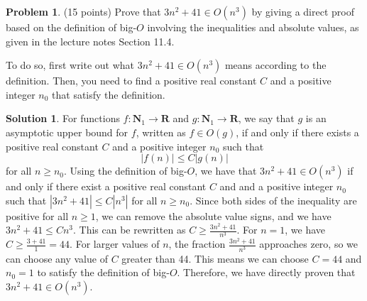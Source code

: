 \documentclass{article}
\theoremstyle{definition}
\newtheorem{problem}{Problem}
\newtheorem*{solution}{Solution}
\newcommand{\N}{\mathbf{N}}
\newcommand{\R}{\mathbf{R}}
\begin{document}
\newpage
\begin{problem} (15 points)
Prove that $3n^2+41 \in O(n^3)$ by giving a direct proof based on the definition of 
big-$O$ involving the inequalities and absolute values, as given in the lecture notes 
Section 11.4.  

To do so, first write out what $3n^2+41 \in O(n^3)$ means according to the definition.  
Then, you need to find a positive real constant $C$ and a positive integer $n_0$ 
that satisfy the definition.
\end{problem}
\begin{solution}
For functions $f: \N_1 \to \R$ and $g: \N_1 \to \R$, we say that $g$ is an asymptotic upper bound for $f$, 
written as $f \in O(g)$, if and only if there exists a positive real constant $C$ and a positive integer $n_0$
such that $$|f(n)| \leq C|g(n)|$$ for all $n \geq n_0$.
Using the definition of big-$O$, we have that $3n^2 + 41 \in O(n^3)$ if and only if 
there exist a positive real constant $C$ and and a positive integer $n_0$
such that $|3n^2 + 41| \leq C|n^3|$ for all $n \geq n_0$.
Since both sides of the inequality are positive for all $n \geq 1$, we can remove the absolute value signs,
and we have $3n^2 + 41 \leq Cn^3$. This can be rewritten as $C \geq \frac{3n^2 + 41}{n^3}$.
For $n = 1$, we have $C \geq \frac{3 + 41}{1} = 44$.
For larger values of $n$, the fraction $\frac{3n^2 + 41}{n^3}$ approaches zero, so we can choose any value of $C$ greater than 44.
This means we can choose $C = 44$ and $n_0 = 1$ to satisfy the definition of big-$O$.
Therefore, we have directly proven that $3n^2 + 41 \in O(n^3)$.
\end{solution}
\end{document}
